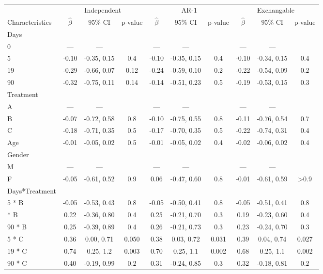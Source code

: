 \begin{table}[!h]
\centering
\begin{tabular}{lccccccccc}
\toprule
\multicolumn{1}{c}{ } & \multicolumn{3}{c}{Independent} & \multicolumn{3}{c}{AR-1} & \multicolumn{3}{c}{Exchangable} \\
\cmidrule(l{3pt}r{3pt}){2-4} \cmidrule(l{3pt}r{3pt}){5-7} \cmidrule(l{3pt}r{3pt}){8-10}
Characteristics & $\widehat\beta$ & $95\%$ CI & p-value & $\widehat\beta$ & $95\%$ CI & p-value & $\widehat\beta$ & $95\%$ CI & p-value\\
\midrule
Days &  &  &  &  &  &  &  &  & \\
0 & — & — &  & — & — &  & — & — & \\
5 & -0.10 & -0.35, 0.15 & 0.4 & -0.10 & -0.35, 0.15 & 0.4 & -0.10 & -0.34, 0.15 & 0.4\\
19 & -0.29 & -0.66, 0.07 & 0.12 & -0.24 & -0.59, 0.10 & 0.2 & -0.22 & -0.54, 0.09 & 0.2\\
90 & -0.32 & -0.75, 0.11 & 0.14 & -0.14 & -0.51, 0.23 & 0.5 & -0.19 & -0.53, 0.15 & 0.3\\
\addlinespace
Treatment &  &  &  &  &  &  &  &  & \\
A & — & — &  & — & — &  & — & — & \\
B & -0.07 & -0.72, 0.58 & 0.8 & -0.10 & -0.75, 0.55 & 0.8 & -0.11 & -0.76, 0.54 & 0.7\\
C & -0.18 & -0.71, 0.35 & 0.5 & -0.17 & -0.70, 0.35 & 0.5 & -0.22 & -0.74, 0.31 & 0.4\\
Age & -0.01 & -0.05, 0.02 & 0.5 & -0.01 & -0.05, 0.02 & 0.4 & -0.02 & -0.06, 0.02 & 0.4\\
\addlinespace
Gender &  &  &  &  &  &  &  &  & \\
M & — & — &  & — & — &  & — & — & \\
F & -0.05 & -0.61, 0.52 & 0.9 & 0.06 & -0.47, 0.60 & 0.8 & -0.01 & -0.61, 0.59 & >0.9\\
Days*Treatment &  &  &  &  &  &  &  &  & \\
5 * B & -0.05 & -0.53, 0.43 & 0.8 & -0.05 & -0.50, 0.41 & 0.8 & -0.05 & -0.51, 0.41 & 0.8\\
\addlinespace
19 * B & 0.22 & -0.36, 0.80 & 0.4 & 0.25 & -0.21, 0.70 & 0.3 & 0.19 & -0.23, 0.60 & 0.4\\
90 * B & 0.25 & -0.39, 0.89 & 0.4 & 0.26 & -0.21, 0.73 & 0.3 & 0.23 & -0.24, 0.70 & 0.3\\
5 * C & 0.36 & 0.00, 0.71 & 0.050 & 0.38 & 0.03, 0.72 & 0.031 & 0.39 & 0.04, 0.74 & 0.027\\
19 * C & 0.74 & 0.25, 1.2 & 0.003 & 0.70 & 0.25, 1.1 & 0.002 & 0.68 & 0.25, 1.1 & 0.002\\
90 * C & 0.40 & -0.19, 0.99 & 0.2 & 0.31 & -0.24, 0.85 & 0.3 & 0.32 & -0.18, 0.81 & 0.2\\
\bottomrule
\end{tabular}
\end{table}
